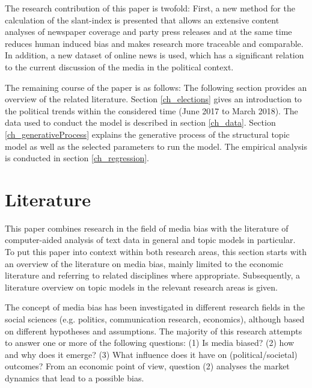 \documentclass[12pt,a4paper,notitlepage]{article}
\begin{document}
The research contribution of this paper is twofold: First, a new method for the calculation of the slant-index is presented that allows an extensive content analyses of newspaper coverage and party press releases and at the same time reduces human induced bias and makes research more traceable and comparable. In addition, a new dataset of online news is used, which has a significant relation to the current discussion of the media in the political context. 

The remaining course of the paper is as follows: The following section provides an overview of the related literature. Section \ref{ch_elections} gives an introduction to the political trends within the considered time (June 2017 to March 2018). The data used to conduct the model is described in section \ref{ch_data}. Section \ref{ch_generativeProcess} explains the generative process of the structural topic model as well as the selected parameters to run the model. The empirical analysis is conducted in section \ref{ch_regression}. 


\section{Literature}

This paper combines research in the field of media bias with the literature of computer-aided analysis of text data in general and topic models in particular. To put this paper into context within both research areas, this section starts with an overview of the literature on media bias, mainly limited to the economic literature and referring to related disciplines where appropriate. Subsequently, a literature overview on topic models in the relevant research areas is given. 

The concept of media bias has been investigated in different research fields in the social sciences (e.g. politics, communication research, economics), although based on different hypotheses and assumptions. The majority of this research attempts to answer one or more of the following questions: (1) Is media biased? (2) how and why does it emerge? (3) What influence does it have on (political/societal) outcomes? From an economic point of view, question (2) analyses the market dynamics that lead to a possible bias.  
\end{document}
